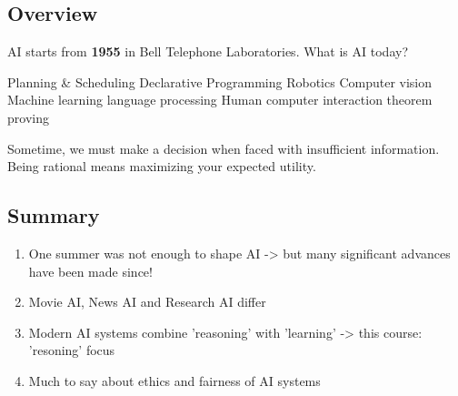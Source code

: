 \subsection{Overview}
AI starts from \textbf{1955} in Bell Telephone Laboratories.
What is AI today?
\begin{outline}
    \1 Planning \& Scheduling
    \1 Declarative Programming
    \1 Robotics
    \1 Computer vision
    \1 Machine learning
    \1 language processing
    \1 Human computer interaction
    \1 theorem proving
\end {outline}
Sometime, we must make a decision when faced with insufficient information.
Being rational means maximizing your expected utility.
\subsection{Summary}
\begin{enumerate}
    \item One summer was not enough to shape AI -> but many significant advances have been made since!
    \item Movie AI, News AI and Research AI differ
    \item Modern AI systems combine 'reasoning' with 'learning' -> this course: 'resoning' focus
    \item Much to say about ethics and fairness of AI systems
\end{enumerate}
\pagebreak